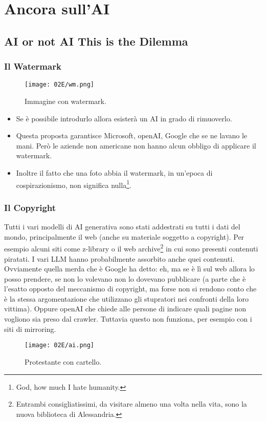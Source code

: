 \chapter{Ancora sull'AI}

\section{AI or not AI This is the Dilemma}

\subsection{Il Watermark}


\begin{figure}[H]
    \centering
    \texttt{[image: 02E/wm.png]}
    \caption{Immagine con watermark.}
\end{figure}



\begin{itemize}
  \item Se è possibile introdurlo allora esisterà un AI in grado di rimuoverlo. 
  \item Questa proposta garantisce Microsoft, openAI, Google che se ne lavano le mani. Però le aziende non americane non hanno alcun obbligo di applicare il watermark.
  \item Inoltre il fatto che una foto abbia il watermark, in un'epoca di cospirazionismo, non significa nulla\footnote{God, how much I hate humanity.}.
\end{itemize}

\subsection{Il Copyright}

Tutti i vari modelli di AI generativa sono stati addestrati su tutti i dati del mondo, principalmente il web (anche su materiale soggetto a copyright). Per esempio alcuni siti come z-library o il web archive\footnote{Entrambi consigliatissimi, da visitare almeno una volta nella vita, sono la nuova biblioteca di Alessandria.} in cui sono presenti contenuti piratati. I vari LLM hanno probabilmente assorbito anche quei contenuti. Ovviamente quella merda che è Google ha detto: eh, ma se è lì sul web allora lo posso prendere, se non lo volevano non lo dovevano pubblicare (a parte che è l'esatto opposto del meccanismo di copyright, ma forse non si rendono conto che è la stessa argomentazione che utilizzano gli stupratori nei confronti della loro vittima). Oppure openAI che chiede alle persone di indicare quali pagine non vogliono sia preso dal crawler. Tuttavia questo non funziona, per esempio con i siti di mirroring.

\begin{figure}[H]
    \centering
    \texttt{[image: 02E/ai.png]}
    \caption{Protestante con cartello.}
\end{figure}






